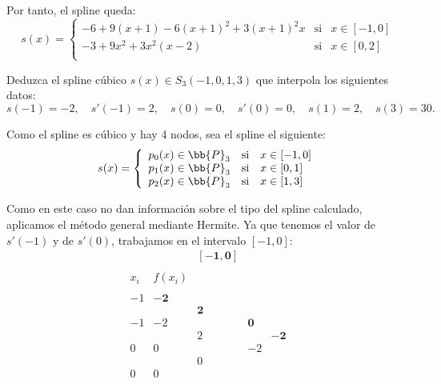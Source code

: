 \begin{ejercicio}
    Por tanto, el spline queda:
    \begin{equation*}
        s(x)=\left\{\begin{array}{lll}
            -6+9(x+1)-6(x+1)^2 +3(x+1)^2x & \text{si} & x\in [-1, 0] \\
            -3 +9x^2+3x^2(x-2) & \text{si} & x\in [0, 2] \\
        \end{array} \right.
    \end{equation*}
    
\end{ejercicio}

\begin{ejercicio}
    Deduzca el spline cúbico $s(x) \in S_3(-1,0,1,3)$ que interpola los siguientes datos:
    \begin{equation*}
        s(-1) = -2,\quad s'(-1) = 2,\quad s(0) = 0,\quad s'(0) = 0,\quad s(1) = 2,\quad s(3) = 30.
    \end{equation*}

    Como el spline es cúbico y hay 4 nodos, sea el spline el siguiente:
    \begin{equation*}
        s(x)=\left\{\begin{array}{ccl}
            p_0(x)\in \bb{P}_3 & \text{si} & x\in [-1, 0] \\
            p_{1}(x)\in \bb{P}_3 & \text{si} & x\in [0,1] \\
            p_{2}(x)\in \bb{P}_3 & \text{si} & x\in [1,3] \\
        \end{array} \right.
    \end{equation*}

    Como en este caso no dan información sobre el tipo del spline calculado, aplicamos el método general mediante Hermite. Ya que tenemos el valor de $s'(-1)$ y de $s'(0)$, trabajamos en el intervalo $[-1,0]$:
    \begin{equation*}
        \begin{array}{c|cccc}
            &&\mathbf{[-1, 0]} \\ \\
            x_i & f(x_i) \\ \\
            -1 & \mathbf{-2} \\
            && \mathbf{2}\\
            -1 & -2 && \mathbf{0}\\
            && 2 && \mathbf{-2}\\ 
            0 & 0 && -2\\
            && 0\\
            0 & 0
        \end{array}
    \end{equation*}


\end{ejercicio}
